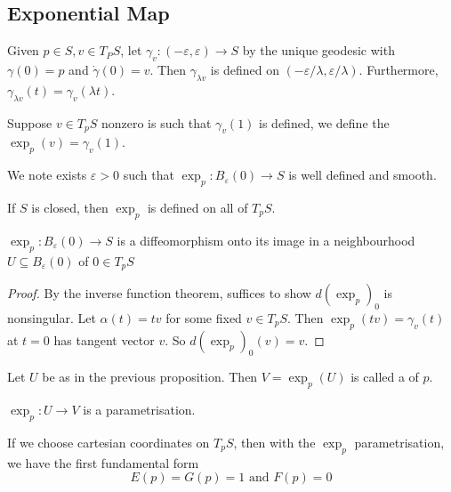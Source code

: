 \documentclass[10pt]{article}
\begin{document}
\subsection{Exponential Map}

\begin{proposition}
Given $p \in S, v \in T_P S$, let $\gamma_v:(-\varepsilon, \varepsilon) \rightarrow S$ by the unique geodesic with $\gamma(0)=p$ and $\dot{\gamma}(0)=v$. Then $\gamma_{\lambda v}$ is defined on $(-\varepsilon / \lambda, \varepsilon / \lambda)$. Furthermore, $\gamma_{\lambda v}(t)=\gamma_v(\lambda t)$.
\end{proposition}

\begin{definition}
    Suppose $v \in T_p S$ nonzero is such that $\gamma_v(1)$ is defined, we define the  $\exp_p(v) = \gamma_v(1)$.
\end{definition}

We note exists $\varepsilon>0$ such that $\exp _p: B_{\varepsilon}(0) \rightarrow S$ is well defined and smooth.

\begin{proposition}
    If $S$ is closed, then $\exp _p$ is defined on all of $T_p S$.
\end{proposition}

\begin{proposition}
    $\exp _p: B_{\varepsilon}(0) \rightarrow S$ is a diffeomorphism onto its image in a neighbourhood $U \subseteq B_{\varepsilon}(0)$ of $0 \in T_p S$
\end{proposition}
\begin{proof}
    By the inverse function theorem, suffices to show $d\left(\exp _p\right)_0$ is nonsingular. Let $\alpha(t)=t v$ for some fixed $v \in T_p S$. Then $\exp _p(t v)=\gamma_v(t)$ at $t=0$ has tangent vector $v$. So $d\left(\exp _p\right)_0(v)=v$.
\end{proof}

\begin{definition}
    Let $U$ be as in the previous proposition. Then $V=\exp _p(U)$ is called a  of $p$.
\end{definition}

\begin{corollary}
    $\exp _p: U \rightarrow V$ is a parametrisation.
\end{corollary}

\begin{proposition}
If we choose cartesian coordinates on $T_p S$, then with the $\exp _p$ parametrisation, we have the first fundamental form
$$
E(p)=G(p)=1 \text { and } F(p)=0
$$
\end{proposition}
\end{document}
